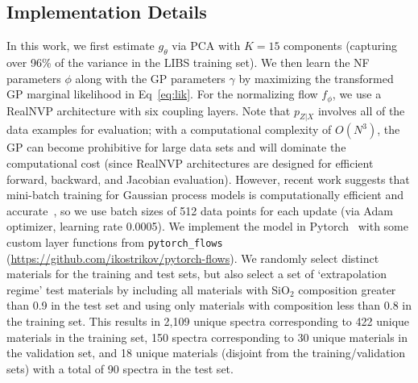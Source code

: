 \documentclass[letterpaper]{article} %
\begin{document}
\subsection{Implementation Details}
In this work, we first estimate $g_\theta$ via PCA with $K = 15$ components (capturing over 96\% of the variance in the LIBS training set).
We then learn the NF parameters $\phi$ along with the GP parameters $\gamma$ by maximizing the transformed GP marginal likelihood in Eq~\ref{eq:lik}.
For the normalizing flow $f_\phi$, we use a RealNVP architecture with six coupling layers.
Note that $p_{Z|X}$ involves all of the data examples for evaluation; with a computational complexity of $O(N^3)$, the GP can become prohibitive for large data sets and will dominate the computational cost (since RealNVP architectures are designed for efficient forward, backward, and Jacobian evaluation). 
However, recent work suggests that mini-batch training for Gaussian process models is computationally efficient and accurate~\cite{chen2020stochastic}, so we use batch sizes of 512 data points for each update (via Adam optimizer, learning rate 0.0005).
We implement the model in Pytorch~\cite{paszke2019pytorch} with some custom layer functions from \texttt{pytorch\_flows} (\url{https://github.com/ikostrikov/pytorch-flows}).
We randomly select distinct materials for the training and test sets, but also select a set of `extrapolation regime' test materials by including all materials with SiO$_2$ composition greater than 0.9 in the test set and using only materials with composition less than 0.8 in the training set.
This results in 2,109 unique spectra corresponding to 422 unique materials in the training set, 150 spectra corresponding to 30 unique materials in the validation set, and 18 unique materials (disjoint from the training/validation sets) with a total of 90 spectra in the test set.
\end{document}
